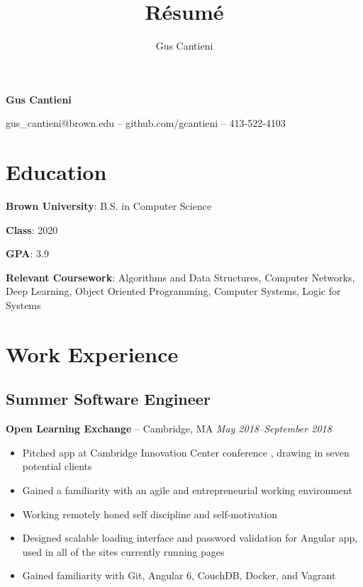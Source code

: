 \documentclass[11pt]{article}
\title{R\'esum\'e}
\author{Gus Cantieni}
\makeatletter
\renewcommand{\maketitle}{
	\begin{center}
		{\huge\bfseries Gus Cantieni}
		\vspace{0.20em}

		gus\_cantieni@brown.edu -- github.com/gcantieni -- 413-522-4103 
		\vspace{-1.50em}
	\end{center}
}
\makeatother
\begin{document}
\maketitle
\section{Education}
\vspace{0.20em}
\begin{minipage}{20em}
	\textbf{Brown University}: B.S. in Computer Science

	\textbf{Class}: 2020

	\textbf{GPA}: 3.9

	\vspace{0.5em}

\end{minipage}
\begin{minipage}{25em}

	\textbf{Relevant Coursework}: Algorithms and Data Structures, Computer Networks, Deep Learning, Object Oriented Programming, Computer Systems, Logic for Systems
\end{minipage}

\section{Work Experience} 
\subsection{Summer Software Engineer} 
\textbf{Open Learning Exchange} -- Cambridge, MA \hfill \textit{May 2018--September 2018}
\begin{itemize}
	\item Pitched app at Cambridge Innovation Center conference , drawing in seven potential clients
	\item Gained a familiarity with an agile and entrepreneurial working environment
	\item Working remotely honed self discipline and self-motivation
	\item Designed scalable loading interface and password validation for Angular app, used in all of the sites currently running pages 
	\item Gained familiarity with Git, Angular 6, CouchDB, Docker, and Vagrant
\end{itemize}
\end{document}
